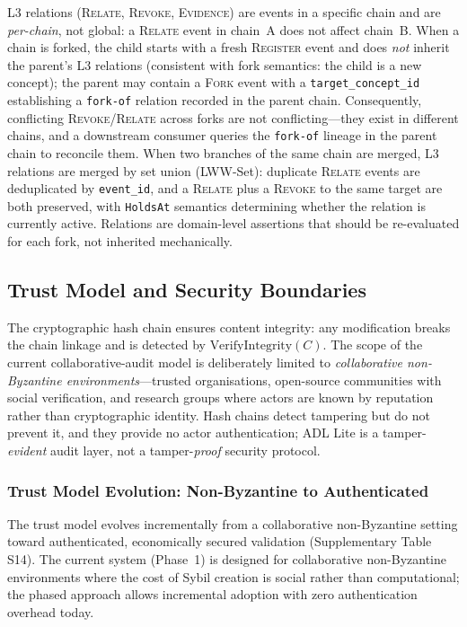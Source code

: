 L3 relations (\textsc{Relate}, \textsc{Revoke}, \textsc{Evidence}) are events in a specific chain and are \emph{per-chain}, not global: a \textsc{Relate} event in chain~A does not affect chain~B. When a chain is forked, the child starts with a fresh \textsc{Register} event and does \emph{not} inherit the parent's L3 relations (consistent with fork semantics: the child is a new concept); the parent may contain a \textsc{Fork} event with a \texttt{target\_concept\_id} establishing a \texttt{fork-of} relation recorded in the parent chain. Consequently, conflicting \textsc{Revoke}/\textsc{Relate} across forks are not conflicting---they exist in different chains, and a downstream consumer queries the \texttt{fork-of} lineage in the parent chain to reconcile them. When two branches of the same chain are merged, L3 relations are merged by set union (LWW-Set): duplicate \textsc{Relate} events are deduplicated by \texttt{event\_id}, and a \textsc{Relate} plus a \textsc{Revoke} to the same target are both preserved, with \texttt{HoldsAt} semantics determining whether the relation is currently active. Relations are domain-level assertions that should be re-evaluated for each fork, not inherited mechanically.

\subsection{Trust Model and Security Boundaries}\label{subsec:trust-model}

The cryptographic hash chain ensures content integrity: any modification breaks the chain linkage and is detected by $\text{VerifyIntegrity}(C)$. The scope of the current collaborative-audit model is deliberately limited to \emph{collaborative non-Byzantine environments}---trusted organisations, open-source communities with social verification, and research groups where actors are known by reputation rather than cryptographic identity. Hash chains detect tampering but do not prevent it, and they provide no actor authentication; ADL Lite is a tamper-\emph{evident} audit layer, not a tamper-\emph{proof} security protocol.

\subsubsection{Trust Model Evolution: Non-Byzantine to Authenticated}\label{subsubsec:trust-evolution}

The trust model evolves incrementally from a collaborative non-Byzantine setting toward authenticated, economically secured validation (Supplementary Table S14). The current system (Phase~1) is designed for collaborative non-Byzantine environments where the cost of Sybil creation is social rather than computational; the phased approach allows incremental adoption with zero authentication overhead today.

